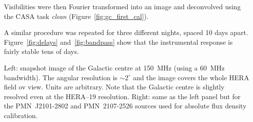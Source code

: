 \documentclass[a0,portrait]{a0poster}
\begin{document}
\begin{multicols}{2}
Visibilities were then Fourier transformed into an image and deconvolved using the CASA task {\it clean} (Figure~\ref{fig:gc_first_cal}).

A similar procedure was repeated for three different nights, spaced 10 days apart. Figure~\ref{fig:delays} and~\ref{fig:bandpass} show that the instrumental response is fairly stable tens of days.

\begin{minipage}{\columnwidth}
    \makeatletter
    \newcommand{\@captype}{figure}
    \makeatother
    \centering
    \qquad%
    \caption{Left: snapshot image of the Galactic centre at 150~MHz (using a 60~MHz bandwidth). The angular resolution is $\sim 2^\circ$ and the image covers the whole HERA field ov view. Units are arbitrary. Note that the Galactic centre is slightly resolved even at the HERA--19 resolution. Right: same as the left panel but for the PMN~J2101-2802 and PMN~2107-2526 sources used for absolute flux density calibration.}
\label{fig:gc_first_cal}
  \end{minipage}
%

\end{multicols}
\end{document}
